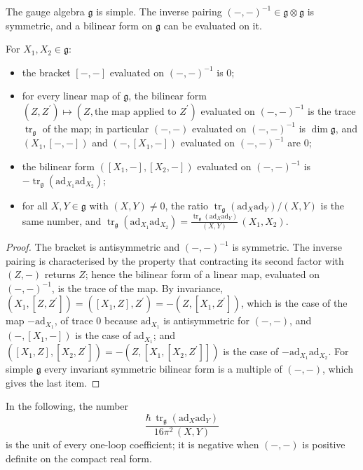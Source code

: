 The gauge algebra $\mathfrak g$ is simple. The inverse pairing $(-,-)^{-1}\in\mathfrak g\otimes\mathfrak g$ is symmetric, and a bilinear form on $\mathfrak g$ can be evaluated on it.

\begin{lemma}
\label{lem:c5-colour}
For $X_1,X_2\in\mathfrak g$:
\begin{itemize}
\item the bracket $[-,-]$ evaluated on $(-,-)^{-1}$ is $0$;
\item for every linear map of $\mathfrak g$, the bilinear form $(Z,Z^{\prime})\mapsto(Z,\text{the map applied to }Z^{\prime})$ evaluated on $(-,-)^{-1}$ is the trace $\operatorname{tr}_{\mathfrak g}$ of the map; in particular $(-,-)$ evaluated on $(-,-)^{-1}$ is $\dim\mathfrak g$, and $(X_1,[-,-])$ and $(-,[X_1,-])$ evaluated on $(-,-)^{-1}$ are $0$;
\item the bilinear form $([X_1,-],[X_2,-])$ evaluated on $(-,-)^{-1}$ is $-\operatorname{tr}_{\mathfrak g}(\mathrm{ad}_{X_1}\mathrm{ad}_{X_2})$;
\item for all $X,Y\in\mathfrak g$ with $(X,Y)\neq0$, the ratio $\operatorname{tr}_{\mathfrak g}(\mathrm{ad}_X\mathrm{ad}_Y)/(X,Y)$ is the same number, and $\operatorname{tr}_{\mathfrak g}(\mathrm{ad}_{X_1}\mathrm{ad}_{X_2})=\frac{\operatorname{tr}_{\mathfrak g}(\mathrm{ad}_X\mathrm{ad}_Y)}{(X,Y)}\,(X_1,X_2)$.
\end{itemize}
\end{lemma}

\begin{proof}
The bracket is antisymmetric and $(-,-)^{-1}$ is symmetric. The inverse pairing is characterised by the property that contracting its second factor with $(Z,-)$ returns $Z$; hence the bilinear form of a linear map, evaluated on $(-,-)^{-1}$, is the trace of the map. By invariance, $(X_1,[Z,Z^{\prime}])=([X_1,Z],Z^{\prime})=-(Z,[X_1,Z^{\prime}])$, which is the case of the map $-\mathrm{ad}_{X_1}$, of trace $0$ because $\mathrm{ad}_{X_1}$ is antisymmetric for $(-,-)$, and $(-,[X_1,-])$ is the case of $\mathrm{ad}_{X_1}$; and $([X_1,Z],[X_2,Z^{\prime}])=-(Z,[X_1,[X_2,Z^{\prime}]])$ is the case of $-\mathrm{ad}_{X_1}\mathrm{ad}_{X_2}$. For simple $\mathfrak g$ every invariant symmetric bilinear form is a multiple of $(-,-)$, which gives the last item.
\end{proof}

In the following, the number
\[
\frac{\hbar\,\operatorname{tr}_{\mathfrak g}(\mathrm{ad}_X\mathrm{ad}_Y)}{16\pi^2\,(X,Y)}
\]
is the unit of every one-loop coefficient; it is negative when $(-,-)$ is positive definite on the compact real form.

